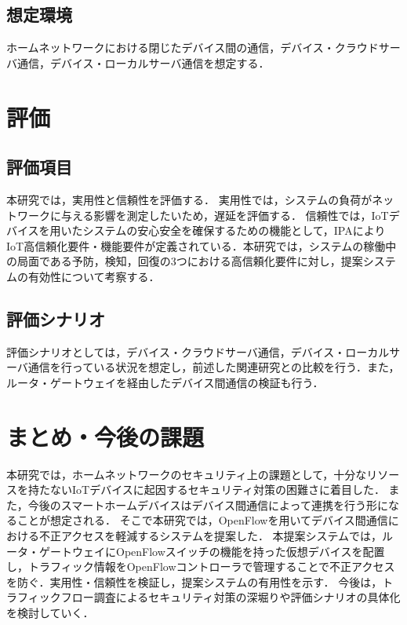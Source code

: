 \documentclass[a4paper,10pt,twocolumn,uplatex]{jsarticle}
\begin{document}
\subsection{想定環境}
ホームネットワークにおける閉じたデバイス間の通信，デバイス・クラウドサーバ通信，デバイス・ローカルサーバ通信を想定する．

\section{評価}
\subsection{評価項目}
本研究では，実用性と信頼性を評価する．
実用性では，システムの負荷がネットワークに与える影響を測定したいため，遅延を評価する．
信頼性では，IoTデバイスを用いたシステムの安心安全を確保するための機能として，IPAによりIoT高信頼化要件・機能要件が定義されている\cite{IPA}．本研究では，システムの稼働中の局面である予防，検知，回復の3つにおける高信頼化要件に対し，提案システムの有効性について考察する．


\subsection{評価シナリオ}
評価シナリオとしては，デバイス・クラウドサーバ通信，デバイス・ローカルサーバ通信を行っている状況を想定し，前述した関連研究との比較を行う．また，ルータ・ゲートウェイを経由したデバイス間通信の検証も行う．

\section{まとめ・今後の課題}
本研究では，ホームネットワークのセキュリティ上の課題として，十分なリソースを持たないIoTデバイスに起因するセキュリティ対策の困難さに着目した．
また，今後のスマートホームデバイスはデバイス間通信によって連携を行う形になることが想定される．
そこで本研究では，OpenFlowを用いてデバイス間通信における不正アクセスを軽減するシステムを提案した．
本提案システムでは，ルータ・ゲートウェイにOpenFlowスイッチの機能を持った仮想デバイスを配置し，トラフィック情報をOpenFlowコントローラで管理することで不正アクセスを防ぐ．実用性・信頼性を検証し，提案システムの有用性を示す．
今後は，トラフィックフロー調査によるセキュリティ対策の深堀りや評価シナリオの具体化を検討していく．
\end{document}
